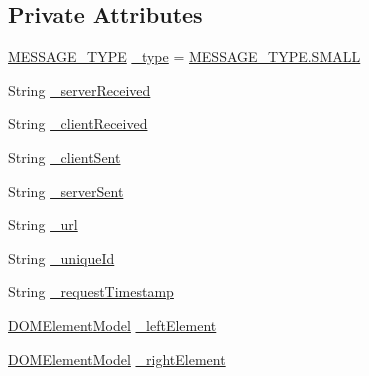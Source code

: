 \subsection*{Private Attributes}
\begin{DoxyCompactItemize}
\item 
\hyperlink{class_web_analyzer_1_1_models_1_1_message_model_1_1_in_data_message_a5c01620a5429c5eec75477e614c96f94}{M\+E\+S\+S\+A\+G\+E\+\_\+\+T\+Y\+P\+E} \hyperlink{class_web_analyzer_1_1_models_1_1_message_model_1_1_in_data_message_a4ec7837996a85d6843efb68bb7a7212f}{\+\_\+type} = \hyperlink{class_web_analyzer_1_1_models_1_1_message_model_1_1_in_data_message_a5c01620a5429c5eec75477e614c96f94a9b9c17e13f0e3dc9860a26e08b59b2a7}{M\+E\+S\+S\+A\+G\+E\+\_\+\+T\+Y\+P\+E.\+S\+M\+A\+L\+L}
\item 
String \hyperlink{class_web_analyzer_1_1_models_1_1_message_model_1_1_in_data_message_ae7aa4bcdfbb85dea10b2bd9eb2065e55}{\+\_\+server\+Received}
\item 
String \hyperlink{class_web_analyzer_1_1_models_1_1_message_model_1_1_in_data_message_a2cc19c547d536622b261fc8798e59dca}{\+\_\+client\+Received}
\item 
String \hyperlink{class_web_analyzer_1_1_models_1_1_message_model_1_1_in_data_message_ae2ac2367bd8e3d621aec791d923481f5}{\+\_\+client\+Sent}
\item 
String \hyperlink{class_web_analyzer_1_1_models_1_1_message_model_1_1_in_data_message_a205ba6190d46da6f4757cdd04e94c6e0}{\+\_\+server\+Sent}
\item 
String \hyperlink{class_web_analyzer_1_1_models_1_1_message_model_1_1_in_data_message_a8043e2e1b5fabe11fdcfe0c5dc2fee68}{\+\_\+url}
\item 
String \hyperlink{class_web_analyzer_1_1_models_1_1_message_model_1_1_in_data_message_a65f5749322bf4e7ac43c6a4bf2702a55}{\+\_\+unique\+Id}
\item 
String \hyperlink{class_web_analyzer_1_1_models_1_1_message_model_1_1_in_data_message_a1900590eddf8f5b387463d7bb7600924}{\+\_\+request\+Timestamp}
\item 
\hyperlink{class_web_analyzer_1_1_models_1_1_data_model_1_1_d_o_m_element_model}{D\+O\+M\+Element\+Model} \hyperlink{class_web_analyzer_1_1_models_1_1_message_model_1_1_in_data_message_a95db3eadcb298b75ea183c5bbf042a57}{\+\_\+left\+Element}
\item 
\hyperlink{class_web_analyzer_1_1_models_1_1_data_model_1_1_d_o_m_element_model}{D\+O\+M\+Element\+Model} \hyperlink{class_web_analyzer_1_1_models_1_1_message_model_1_1_in_data_message_a888d6b4c7153dd3e469cd963567fb7c7}{\+\_\+right\+Element}
\end{DoxyCompactItemize}
